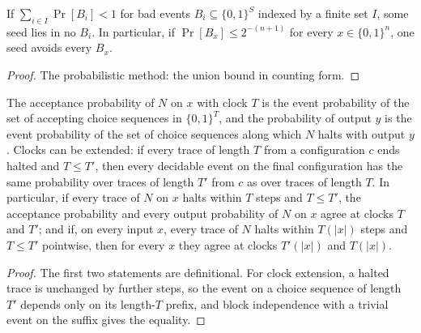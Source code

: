 \begin{lemma}
  \label{lem:encodings-good-seed}
  \leanok
  If $\sum_{i \in I} \Pr[B_i] < 1$ for bad events $B_i \subseteq \{0,1\}^S$
  indexed by a finite set $I$, some seed lies in no $B_i$. In particular, if
  $\Pr[B_x] \le 2^{-(n+1)}$ for every $x \in \{0,1\}^n$, one seed avoids every
  $B_x$.
\end{lemma}
\begin{proof}
  \leanok
  The probabilistic method: the union bound in counting form.
\end{proof}

\begin{lemma}
  \label{lem:encodings-acceptprob}
  \leanok
  The acceptance probability of $N$ on $x$ with clock $T$ is the event
  probability of the set of accepting choice sequences in $\{0,1\}^T$, and the
  probability of output $y$ is the event probability of the set of choice
  sequences along which $N$ halts with output $y$. Clocks can be extended: if
  every trace of length $T$ from a configuration $c$ ends halted and
  $T \le T'$, then every decidable event on the final configuration has the
  same probability over traces of length $T'$ from $c$ as over traces of
  length $T$. In particular, if every trace of $N$ on $x$ halts within $T$
  steps and $T \le T'$, the acceptance probability and every output
  probability of $N$ on $x$ agree at clocks $T$ and $T'$; and if, on every
  input $x$, every trace of $N$ halts within $T(|x|)$ steps and $T \le T'$
  pointwise, then for every $x$ they agree at clocks $T'(|x|)$ and $T(|x|)$.
\end{lemma}
\begin{proof}
  \leanok
  The first two statements are definitional. For clock extension, a halted
  trace is unchanged by further steps, so the event on a choice sequence of
  length $T'$ depends only on its length-$T$ prefix, and block independence
  with a trivial event on the suffix gives the equality.
\end{proof}

